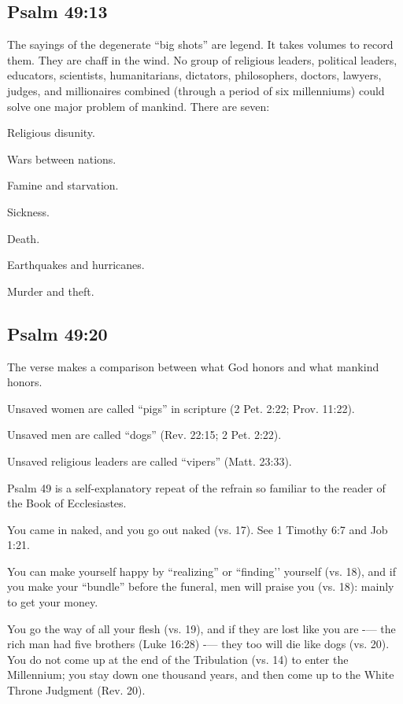 \subsection{Psalm 49:13}
The sayings of the degenerate ``big shots'' are legend. It takes volumes to record them. They are chaff in the wind. No group of religious leaders, political leaders, educators, scientists, humanitarians, dictators, philosophers, doctors, lawyers, judges, and millionaires combined (through a period of six millenniums) could solve one major problem of mankind. There are seven:\cite{Ruckman1992Psalms}\begin{compactenum}
    \item Religious disunity.
    \item Wars between nations.
    \item Famine and starvation.
    \item Sickness.
    \item Death.
    \item Earthquakes and hurricanes.
    \item Murder and theft.
\end{compactenum}

\subsection{Psalm 49:20}
The verse makes a comparison between what God honors and what mankind honors. \cite{Ruckman1992Psalms} \begin{compactenum}
    \item Unsaved women  are called “pigs” in scripture (2 Pet. 2:22; Prov. 11:22).
    \item Unsaved men are called “dogs” (Rev. 22:15; 2 Pet. 2:22).
    \item Unsaved religious leaders are called “vipers” (Matt. 23:33).
\end{compactenum}
Psalm 49 is a self-explanatory repeat of the refrain so familiar to the reader of the Book of Ecclesiastes. \cite{Ruckman1992Psalms}\begin{compactenum}
\item You came in naked, and you go out naked (vs. 17). See  1 Timothy 6:7 and Job 1:21.
\item You can make yourself happy by “realizing” or “finding’’ yourself (vs. 18), and if you make your “bundle” before the funeral, men will praise you (vs. 18): mainly to get your money.
\item You go the way of all your flesh (vs. 19), and if they are lost like you are -— the rich man had five brothers (Luke 16:28) -— they too will die like dogs (vs. 20). You do not come up at the end of the Tribulation (vs. 14) to enter the Millennium; you stay down one thousand years, and then come up to the White Throne Judgment (Rev. 20).
\end{compactenum}